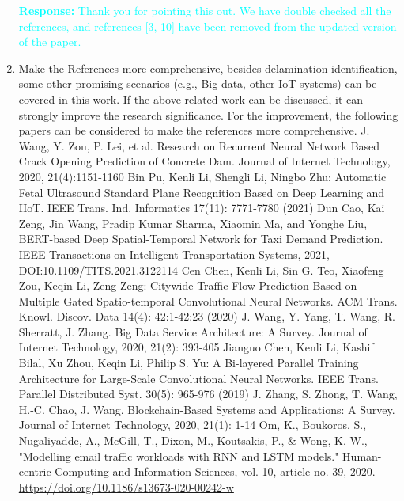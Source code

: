 \documentclass[11pt,a2paper]{report}
\begin{document}
\begin{enumerate}
\textcolor{Cyan}{
	\textbf{Response:}
	Thank you for pointing this out.
	We have double checked all the references, and references [3, 10] have been 
	removed from the updated version of the paper.
}

			\item Make the References more comprehensive, besides delamination 
			identification, some other promising scenarios (e.g., Big data, 
			other IoT systems) can be covered in this work.
			If the above related work can be discussed, it can strongly improve 
			the research significance. For the improvement, the following 
			papers can be considered to make the references more comprehensive.
			\newline
			\newline
			\newline
			J. Wang, Y. Zou, P. Lei, et al. Research on Recurrent Neural 
			Network Based Crack Opening Prediction of Concrete Dam. Journal of 
			Internet Technology, 2020, 21(4):1151-1160
			\newline
			\newline
			Bin Pu, Kenli Li, Shengli Li, Ningbo Zhu: Automatic Fetal 
			Ultrasound Standard Plane Recognition Based on Deep Learning and 
			IIoT. IEEE Trans. Ind. Informatics 17(11): 7771-7780 (2021)
			\newline
			\newline
			Dun Cao, Kai Zeng, Jin Wang, Pradip Kumar Sharma, Xiaomin Ma, and 
			Yonghe Liu, BERT-based Deep Spatial-Temporal Network for Taxi 
			Demand 
			Prediction. IEEE Transactions on Intelligent Transportation 
			Systems, 2021, DOI:10.1109/TITS.2021.3122114
			\newline
			\newline
			Cen Chen, Kenli Li, Sin G. Teo, Xiaofeng Zou, Keqin Li, Zeng Zeng: 
			Citywide Traffic Flow Prediction Based on Multiple Gated 
			Spatio-temporal Convolutional Neural Networks. ACM Trans. Knowl. 
			Discov. Data 14(4): 42:1-42:23 (2020)
			\newline
			\newline
			J. Wang, Y. Yang, T. Wang, R. Sherratt, J. Zhang. Big Data Service 
			Architecture: A Survey. Journal of Internet Technology, 2020, 
			21(2): 393-405
			\newline
			\newline
			Jianguo Chen, Kenli Li, Kashif Bilal, Xu Zhou, Keqin Li, Philip S. 
			Yu: A Bi-layered Parallel Training Architecture for Large-Scale 
			Convolutional Neural Networks. IEEE Trans. Parallel Distributed 
			Syst. 30(5): 965-976 (2019)
			\newline
			\newline
			J. Zhang, S. Zhong, T. Wang, H.-C. Chao, J. Wang. Blockchain-Based 
			Systems and Applications: A Survey. Journal of Internet Technology, 
			2020, 21(1): 1-14
			\newline
			\newline
			Om, K., Boukoros, S., Nugaliyadde, A., McGill, T., Dixon, M., 
			Koutsakis, P., \& Wong, K. W., "Modelling email traffic workloads 
			with RNN and LSTM models." Human-centric Computing and Information 
			Sciences, vol. 10, article no. 39, 2020. 
			\url{https://doi.org/10.1186/s13673-020-00242-w}
			


\end{enumerate}
\end{document}
